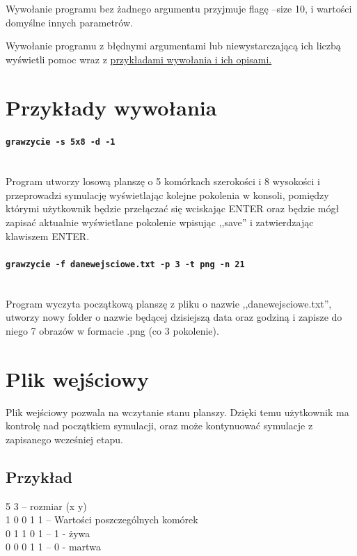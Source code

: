 \documentclass{report}
\begin{document}
Wywołanie programu bez żadnego argumentu przyjmuje flagę --size 10, i wartości domyślne innych parametrów.

Wywołanie programu z błędnymi argumentami lub niewystarczającą ich liczbą wyświetli pomoc wraz z   \hyperref[przyklady]{\textcolor{LinkColor}{przykładami wywołania i ich opisami.}}

\section{Przykłady wywołania}  \label{przyklady}
\paragraph{\texttt{gra\textunderscore{}w\textunderscore{}zycie -s 5x8 -d -1}} \mbox{} \\
Program utworzy losową planszę o 5 komórkach szerokości i 8 wysokości i przeprowadzi symulację wyświetlając kolejne pokolenia w konsoli, pomiędzy którymi użytkownik będzie przełączać się wciskając ENTER oraz będzie mógł zapisać aktualnie wyświetlane pokolenie wpisując ,,save'' i zatwierdzając klawiszem ENTER.

\paragraph{\texttt{gra\textunderscore{}w\textunderscore{}zycie -f dane\textunderscore{}wejsciowe.txt -p 3 -t png -n 21}} \mbox{} \\
Program wyczyta początkową planszę z pliku o nazwie ,,dane\textunderscore{}wejsciowe.txt'', utworzy nowy folder o nazwie będącej dzisiejszą data oraz godziną i zapisze do niego 7 obrazów w formacie .png (co 3 pokolenie). 


\section{Plik wejściowy}  \label{format}
Plik wejściowy pozwala na wczytanie stanu planszy. Dzięki temu użytkownik ma kontrolę nad początkiem symulacji, oraz może kontynuować symulacje z zapisanego wcześniej etapu.

\subsection{Przykład}
5 3 \tab -- rozmiar (x y) \\
1 0 0 1 1 \tab -- Wartości poszczególnych komórek \\
0 1 1 0 1 \tab -- 1 - żywa \\
0 0 0 1 1 \tab -- 0 - martwa \\
\end{document}
